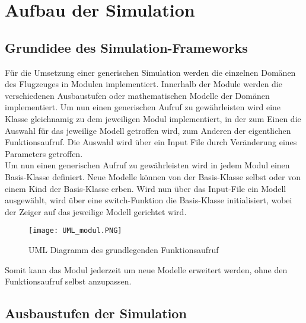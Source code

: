 \chapter{Aufbau der Simulation}
\section{Grundidee des Simulation-Frameworks}
Für die Umsetzung einer generischen Simulation werden die einzelnen Domänen des Flugzeuges in Modulen implementiert. Innerhalb der Module werden die verschiedenen Ausbaustufen oder mathematischen Modelle der Domänen implementiert. Um nun einen generischen Aufruf zu gewährleisten wird eine Klasse gleichnamig zu dem jeweiligen Modul implementiert, in der zum Einen die Auswahl für das jeweilige Modell getroffen wird, zum Anderen der eigentlichen Funktionsaufruf. Die Auswahl wird über ein Input File durch Veränderung eines Parameters getroffen. \\
Um nun einen generischen Aufruf zu gewährleisten wird in jedem Modul einen Basis-Klasse definiert. Neue Modelle können von der Basis-Klasse selbst oder von einem Kind der Basis-Klasse erben. Wird nun über das Input-File ein Modell ausgewählt, wird über eine switch-Funktion die Basis-Klasse initialisiert, wobei der Zeiger auf das jeweilige Modell gerichtet wird. \\
\begin{figure}[h]
\centering\texttt{[image: UML\_modul.PNG]}	
\caption{UML Diagramm des grundlegenden Funktionsaufruf}
\label{fig:UML_modul}
\end{figure}

Somit kann das Modul jederzeit um neue Modelle erweitert werden, ohne den Funktionsaufruf selbst anzupassen.  
\section{Ausbaustufen der Simulation}

